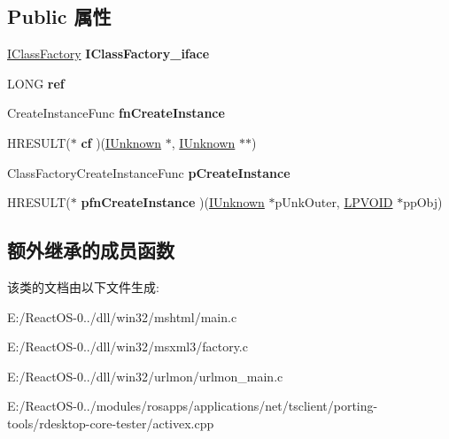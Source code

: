 \subsection*{Public 属性}
\begin{DoxyCompactItemize}
\item 
\mbox{\label{struct_class_factory_a3465f2c481fc56903fe32cbeff58e00a}} 
\hyperlink{interface_i_class_factory}{I\+Class\+Factory} {\bfseries I\+Class\+Factory\+\_\+iface}
\item 
\mbox{\label{struct_class_factory_a5ba4f8ac8fa9c3a66dfe604a3d581947}} 
L\+O\+NG {\bfseries ref}
\item 
\mbox{\label{struct_class_factory_a5313ed3c9f492b106f4c7b1a2b64a42f}} 
Create\+Instance\+Func {\bfseries fn\+Create\+Instance}
\item 
\mbox{\label{struct_class_factory_ae8435c91ca75a49c8f31bf422d87891d}} 
H\+R\+E\+S\+U\+LT($\ast$ {\bfseries cf} )(\hyperlink{interface_i_unknown}{I\+Unknown} $\ast$, \hyperlink{interface_i_unknown}{I\+Unknown} $\ast$$\ast$)
\item 
\mbox{\label{struct_class_factory_afb7aebdedcdde40c90bc1851e6afbce5}} 
Class\+Factory\+Create\+Instance\+Func {\bfseries p\+Create\+Instance}
\item 
\mbox{\label{struct_class_factory_aec4ae0fff4ddb017b549e452a93b2995}} 
H\+R\+E\+S\+U\+LT($\ast$ {\bfseries pfn\+Create\+Instance} )(\hyperlink{interface_i_unknown}{I\+Unknown} $\ast$p\+Unk\+Outer, \hyperlink{interfacevoid}{L\+P\+V\+O\+ID} $\ast$pp\+Obj)
\end{DoxyCompactItemize}
\subsection*{额外继承的成员函数}


该类的文档由以下文件生成\+:\begin{DoxyCompactItemize}
\item 
E\+:/\+React\+O\+S-\/0../dll/win32/mshtml/main.\+c\item 
E\+:/\+React\+O\+S-\/0../dll/win32/msxml3/factory.\+c\item 
E\+:/\+React\+O\+S-\/0../dll/win32/urlmon/urlmon\+\_\+main.\+c\item 
E\+:/\+React\+O\+S-\/0../modules/rosapps/applications/net/tsclient/porting-\/tools/rdesktop-\/core-\/tester/activex.\+cpp\end{DoxyCompactItemize}
